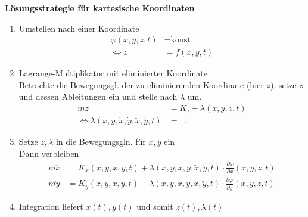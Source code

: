 \documentclass{article}
\begin{document}
\textbf{Lösungsstrategie für kartesische Koordinaten}
	\begin{enumerate}
		\item Umstellen nach einer Koordinate
			\begin{align*}
				\varphi(x,y,z,t) &= \text{konst} \\
				\Leftrightarrow z &= f(x,y,t)
			\end{align*}
			
		\item Lagrange-Multiplikator mit eliminierter Koordinate\\
		Betrachte die Bewegungsgl. der zu eliminierenden Koordinate (hier $z$), setze $z$ und dessen Ableitungen ein und stelle nach $\lambda$ um.
			\begin{align*}
				m\ddot{z} &= K_z + \lambda(x,y,z,t) \\
				\Leftrightarrow \lambda(x,y,\dot{x},\dot{y},\ddot{x},\ddot{y},t) &= ...			
			\end{align*}
			
		\item Setze $z,\lambda$ in die Bewegungsgln. für $x,y$ ein\\
		Dann verbleiben
			\begin{align*}
				m\ddot{x} &= K_x(x,y,\dot{x},\dot{y},t) + \lambda(x,y,\dot{x},\dot{y},\ddot{x},\ddot{y},t) \cdot \frac{\partial\varphi}{\partial x}(x,y,z,t)\\
				m\ddot{y} &= K_y(x,y,\dot{x},\dot{y},t) + \lambda(x,y,\dot{x},\dot{y},\ddot{x},\ddot{y},t) \cdot \frac{\partial\varphi}{\partial y}(x,y,z,t)		
			\end{align*}
		
		\item Integration liefert $x(t),y(t)$ und somit $z(t),\lambda(t)$
	\end{enumerate}


\newpage
\end{document}
